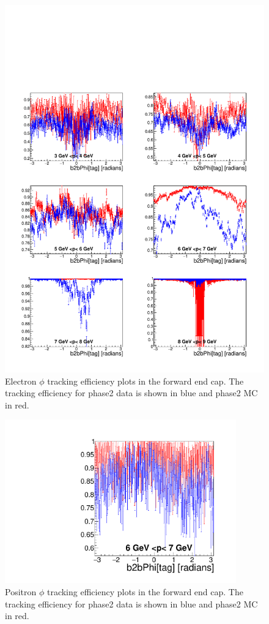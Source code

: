 \documentclass[a4paper,11pt,twosided,final,german,openbib,pdftex,listof=totoc,bibliography=totoc]{scrbook}
\begin{document}
\begin{figure}[!htbp]
	\centering
	\includegraphics[width=\textwidth]{Plots/master/xPMPhiemFC}
	\caption[Momentum $\phi$ Electron Forward End Cap Efficiency Phase2]{Electron $\phi$ tracking efficiency plots in the forward end cap. The tracking efficiency for phase2 data is shown in blue and phase2 MC in red.}
		\label{plt:xPMPhiemFC}
\end{figure}




\begin{figure}[!htbp]
	\centering
	\includegraphics[width=10cm]{Plots/master/xPMPhiepFC}
	\caption[Momentum $\phi$ Positron Forward End Cap Efficiency Phase2]{Positron $\phi$ tracking efficiency plots in the forward end cap. The tracking efficiency for phase2 data is shown in blue and phase2 MC in red.}
		\label{plt:xPMPhiepFC}
\end{figure}
\end{document}

